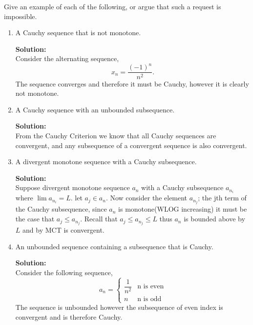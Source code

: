 \documentclass[12pt]{article}
\makeatletter
\theoremstyle{homework}
\newenvironment{exercise}[1]
{\def\@currentlabel{#1}\exercisecore}
{\endexercisecore}
\newcommand{\localhead}[1]{\par\smallskip\noindent\textbf{#1}\nobreak\\}%
\newcommand\solution{\localhead{Solution:}}
\makeatother
\begin{document}
\begin{exercise}{2.6.2} Give an example of each of the following, or argue that 
	such a request is impossible.\\
	\begin{enumerate}
		\item A Cauchy sequence that is not monotone.\\
		 \solution Consider the alternating sequence,
		 \begin{equation*}
			 x_n = \dfrac{(-1)^n}{n^2}.
		 \end{equation*}
		 The sequence converges and therefore it must be Cauchy, however it is clearly not monotone.
		 \vspace{.25in}
		 
		\item A Cauchy sequence with an unbounded subsequence.\\
		\solution From the Cauchy Criterion we know that all Cauchy sequences are convergent, and any subsequence of a convergent sequence is also convergent.\\
		\vspace{.25in}

		\item A divergent monotone sequence with a Cauchy subsequence.\\
		\solution Suppose divergent monotone sequence $a_n$ with a Cauchy subsequence $a_{{n}_{i}}$ where
		$\lim a_{{n}_{i}} = L$. let $a_j \in a_n$. Now consider the element $a_{{n}_{j}}$; the jth term of the Cauchy subsequence, since $a_n$
		is monotone(WLOG increasing) it must be the case that $a_j \leq a_{{n}_{j}}$. Recall that $a_j \leq a_{{n}_{j}} \leq L$ thus $a_n$ is bounded above by $L$ and by MCT is convergent.
		\vspace{.25in}

		 \item An unbounded sequence containing a subsequence that is Cauchy.\\
		 \solution Consider the following sequence,
		 \[ a_n =  \begin{cases} 
			\dfrac{1}{n^2} & \text{n is even} \\
			n & \text{n is odd} 
		 \end{cases}
	  	\]
		 The sequence is unbounded however the subsequence of even index is convergent and is therefore Cauchy. 
	\end{enumerate}
\end{exercise}
\vspace{.5in}
\end{document}
